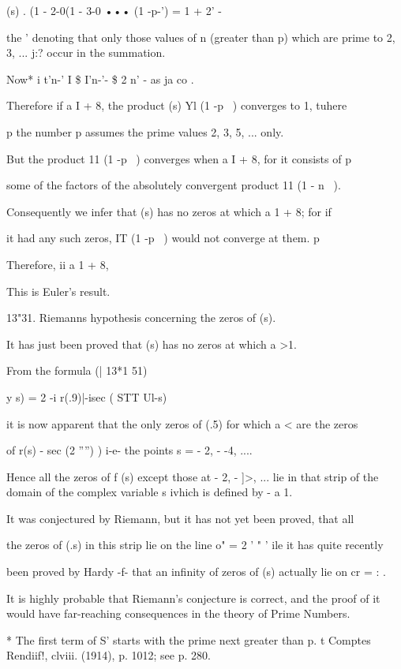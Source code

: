  (s) . (1 - 2-0(1 - 3-0 ••• (1 -p-') = 1 + 2' -

the ' denoting that only those values of n (greater than p) which are
prime to 2, 3, ... j:? occur in the summation.

Now* i t'n-' I \$ I'n-'- \$ 2 n' - as ja co .

Therefore if a I + 8, the product (s) Yl (1 -p~ ) converges to 1,
tuhere

p the number p assumes the prime values 2, 3, 5, ... only.

But the product 11 (1 -p~ ) converges when a I + 8, for it consists of
p

some of the factors of the absolutely convergent product 11 (1 - n~ ).

Consequently we infer that (s) has no zeros at which a 1 + 8; for if

it had any such zeros, IT (1 -p~ ) would not converge at them. p

Therefore, ii a 1 + 8,

This is Euler's result.

13"31. Riemanns hypothesis concerning the zeros of (s).

It has just been proved that (s) has no zeros at which a >1.

From the formula (| 13*1 51)

y s) = 2 -i r(.9)|-isec ( STT Ul-s)

it is now apparent that the only zeros of (.5) for which a < are the
zeros

of r(s) - sec (2 '''') ) i-e- the points s = - 2, - -4, ....

Hence all the zeros of f (s) except those at - 2, - ]>, ... lie in
that strip of the domain of the complex variable s ivhich is defined
by - a 1.

It was conjectured by Riemann, but it has not yet been proved, that
all

the zeros of (.s) in this strip lie on the line o" = 2 ' " ' ile it
has quite recently

been proved by Hardy -f- that an infinity of zeros of (s) actually lie
on cr = : .

It is highly probable that Riemann's conjecture is correct, and the
proof of it would have far-reaching consequences in the theory of
Prime Numbers.

* The first term of S' starts with the prime next greater than p. t
Comptes Rendiif!, clviii. (1914), p. 1012; see p. 280.

%
%

